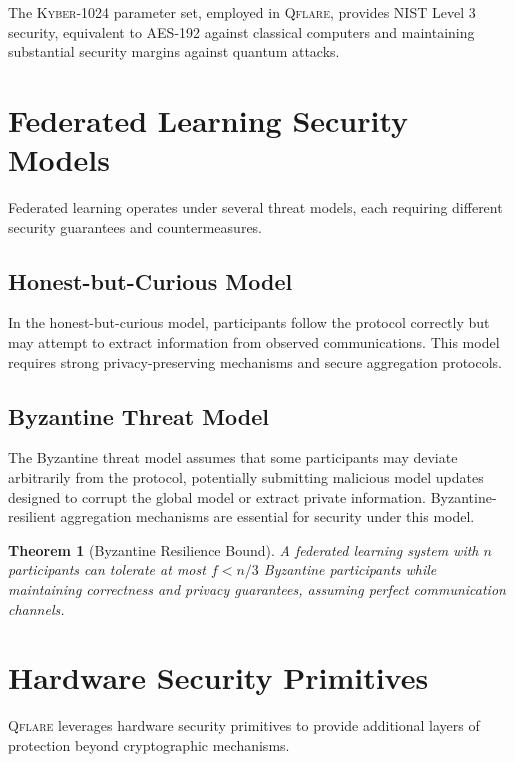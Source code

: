 ﻿\documentclass[12pt,a4paper,twoside]{book}
\newcommand{\qflare}{\textsc{Qflare}}
\newcommand{\kyber}{\textsc{Kyber}}
\newtheorem{theorem}{Theorem}[chapter]
\begin{document}
The \kyber{}-1024 parameter set, employed in \qflare{}, provides NIST Level 3 security, equivalent to AES-192 against classical computers and maintaining substantial security margins against quantum attacks.

\section{Federated Learning Security Models}
\label{sec:fl-security-models}

Federated learning operates under several threat models, each requiring different security guarantees and countermeasures.

\subsection{Honest-but-Curious Model}
\label{subsec:honest-curious}

In the honest-but-curious model, participants follow the protocol correctly but may attempt to extract information from observed communications. This model requires strong privacy-preserving mechanisms and secure aggregation protocols.

\subsection{Byzantine Threat Model}
\label{subsec:byzantine}

The Byzantine threat model assumes that some participants may deviate arbitrarily from the protocol, potentially submitting malicious model updates designed to corrupt the global model or extract private information. Byzantine-resilient aggregation mechanisms are essential for security under this model.

\begin{theorem}[Byzantine Resilience Bound]
\label{thm:byzantine-bound}
A federated learning system with $n$ participants can tolerate at most $f < n/3$ Byzantine participants while maintaining correctness and privacy guarantees, assuming perfect communication channels.
\end{theorem}

\section{Hardware Security Primitives}
\label{sec:hardware-security}

\qflare{} leverages hardware security primitives to provide additional layers of protection beyond cryptographic mechanisms.
\end{document}

